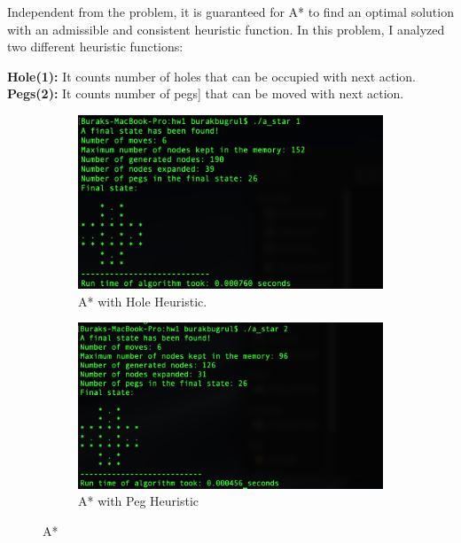 \documentclass[11pt]{article}
\begin{document}
	Independent from the problem, it is guaranteed for A* to find an optimal solution with an admissible and consistent heuristic function. In this problem, I analyzed two different heuristic functions:
	
	\textbf{Hole(1):} It counts number of holes that can be occupied with next action.\\
	\textbf{Pegs(2):} It counts number of pegs] that can be moved with next action.\\
	
	\begin{figure}[h!]
		\centering
		\begin{subfigure}[b]{0.4\linewidth}
			\includegraphics[width=\linewidth]{images/a_star_1.png}
			\caption{A* with Hole Heuristic.}
		\end{subfigure}
		\begin{subfigure}[b]{0.42\linewidth}
			\includegraphics[width=\linewidth]{images/a_star_2.png}
			\caption{A* with Peg Heuristic}
		\end{subfigure}
		\caption{A*}
		\label{fig:A*}
	\end{figure}
\end{document}
